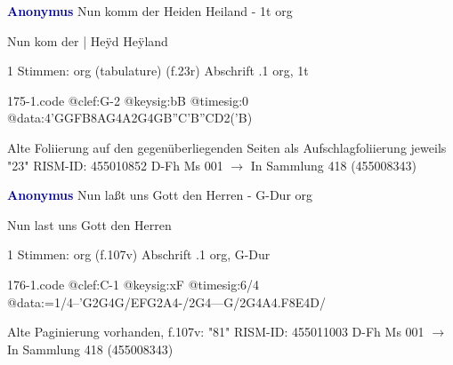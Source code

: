\documentclass[twocolumn]{book}
\begin{document}
\newline \par \vspace{7pt} \textcolor{darkblue}{\textbf{Anonymus  }}
\newline Nun komm der Heiden Heiland - 1t
\newline org
\newline \begin{itshape}[f.23r, at left:] Nun kom der | Heÿd Heÿland\end{itshape} 
\newline \textcolor{darkblue}{}  1 Stimmen: org (tabulature)  (f.23r)
\newline Abschrift
.1  org, 1t  
\begin{filecontents*}{175-1.code}
@clef:G-2
@keysig:bB
@timesig:0
@data:4'GGFB{8AG}4A2G4GB''C'B''CD2('B)
\end{filecontents*}
\newline
%
\newline Alte Foliierung auf den gegenüberliegenden Seiten als Aufschlagfoliierung jeweils "23"
\newline RISM-ID: 455010852
\newline D-Fh  Ms 001
\newline $\rightarrow$ In Sammlung 418 (455008343)
      
\newline \par \vspace{7pt} \textcolor{darkblue}{\textbf{Anonymus  }}
\newline Nun laßt uns Gott den Herren - G-Dur
\newline org
\newline \begin{itshape}[f.107v, heading:] Nun last uns Gott den Herren\end{itshape} 
\newline \textcolor{darkblue}{}  1 Stimmen: org  (f.107v)
\newline Abschrift
.1  org, G-Dur  
\begin{filecontents*}{176-1.code}
@clef:C-1
@keysig:xF
@timesig:6/4
@data:=1/4--'G2G4G/EFG2A4-/2G4---G/2G4A4.F8E4D/
\end{filecontents*}
\newline
%
\newline Alte Paginierung vorhanden, f.107v: "81"
\newline RISM-ID: 455011003
\newline D-Fh  Ms 001
\newline $\rightarrow$ In Sammlung 418 (455008343)
      
\end{document}
